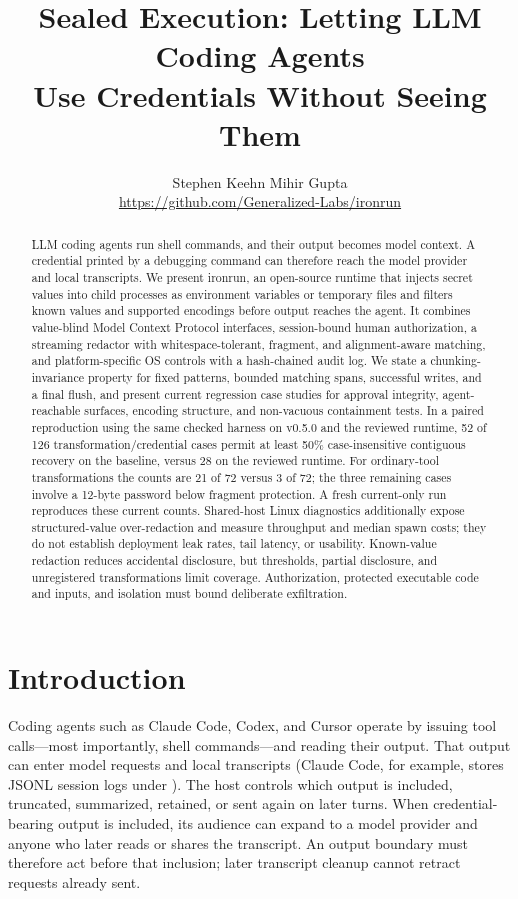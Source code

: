 \documentclass[10pt,twocolumn]{article}
\title{\Large\bfseries Sealed Execution: Letting LLM Coding Agents\\Use Credentials Without Seeing Them}
\author{%
  Stephen Keehn \qquad Mihir Gupta\\[2pt]
  \normalsize\url{https://github.com/Generalized-Labs/ironrun}}
\date{}
\newcommand{\sys}{\textsf{ironrun}}
\newcommand{\code}[1]{\textup{\texttt{\detokenize{#1}}}}
\begin{document}
\maketitle

\begin{abstract}
LLM coding agents run shell commands, and their output becomes model context.
A credential printed by a debugging command can therefore reach the model
provider and local transcripts. We present \sys{}, an open-source runtime
that injects secret values into child processes as environment variables or
temporary files and filters known values and supported encodings before output
reaches the agent. It combines value-blind Model Context Protocol interfaces,
session-bound human authorization, a streaming redactor with whitespace-tolerant,
fragment, and alignment-aware matching, and platform-specific OS controls with a
hash-chained audit log. We state a chunking-invariance property for fixed
patterns, bounded matching spans, successful writes, and a final flush, and
present current regression case studies for approval integrity, agent-reachable
surfaces, encoding structure, and non-vacuous containment tests. In a paired
reproduction using the same checked harness on v0.5.0 and the reviewed runtime,
52 of 126 transformation/credential cases permit at least 50\% case-insensitive
contiguous recovery on the baseline, versus 28 on the reviewed runtime.
For ordinary-tool transformations the counts are 21 of 72 versus 3 of 72;
the three remaining cases involve a 12-byte password below fragment protection.
A fresh current-only run reproduces these current counts. Shared-host Linux
diagnostics additionally expose structured-value over-redaction and measure
throughput and median spawn costs; they do not establish deployment leak rates,
tail latency, or usability. Known-value redaction reduces accidental disclosure,
but thresholds, partial disclosure, and unregistered transformations limit
coverage. Authorization, protected executable code and inputs, and isolation
must bound deliberate exfiltration.
\end{abstract}

\section{Introduction}
\label{sec:intro}

Coding agents such as Claude Code, Codex, and Cursor operate by issuing tool
calls---most importantly, shell commands---and reading their output. That
output can enter model requests and local transcripts (Claude Code, for example,
stores JSONL session logs under \code{~/.claude/projects/}). The host controls
which output is included, truncated, summarized, retained, or sent again on
later turns. When credential-bearing output is included, its audience can expand
to a model provider and anyone who later reads or shares the transcript. An
output boundary must therefore act before that inclusion; later transcript
cleanup cannot retract requests already sent.
\end{document}

